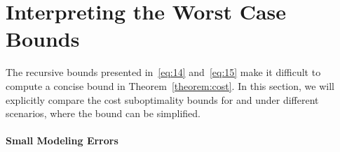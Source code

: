 
\section{Interpreting the Worst Case Bounds}
\label{sec:interpr-worst-case}

The recursive bounds
presented in~\eqref{eq:14} and~\eqref{eq:15} make it difficult to
compute a concise bound in Theorem~\ref{theorem:cost}. In this
section, we will explicitly compare the cost suboptimality
bounds for \MM{} and \ILC{} under different scenarios, where the bound can
be simplified.

\paragraph{Small Modeling Errors}
\label{sec:small-model-errors}


